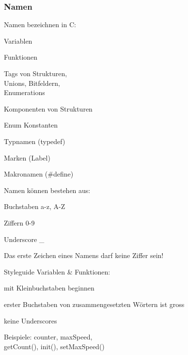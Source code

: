  		\subsubsection{Namen}
 			\begin{minipage}[t]{5 cm}
 				Namen bezeichnen in C:
 				\begin{compactitem}
					\item Variablen
					\item Funktionen
					\item Tags von Strukturen, \\Unions, Bitfeldern, \\Enumerations
					\item Komponenten von Strukturen
					\item Enum Konstanten
					\item Typnamen (typedef)
					\item Marken (Label)
					\item Makronamen (\#define)
 				\end{compactitem}
 			\end{minipage}
 			\hspace*{1.0cm}
 			\begin{minipage}[t]{5 cm}
	 			Namen können bestehen aus:
	 			\begin{compactitem}
					\item Buchstaben a-z, A-Z
					\item Ziffern 0-9
					\item Underscore \_
	 			\end{compactitem}
	 			\vspace*{0.2cm} 
	 			Das erste Zeichen eines Namens darf keine Ziffer sein!
	 		\end{minipage}
	 		\hspace*{1.0cm}
	 		\begin{minipage}[t]{6 cm}
		 		Styleguide Variablen \& Funktionen:
		 		\begin{compactitem}
		 			\item mit Kleinbuchstaben beginnen	 			
		 			\item erster Buchstaben von zusammengesetzten Wörtern ist gross	
		 			\item keine Underscores
		 		\end{compactitem}
		 		\vspace*{0.2cm} 
		 		Beispiele: counter, maxSpeed, \\getCount(), init(), setMaxSpeed()	
	 		\end{minipage}			

